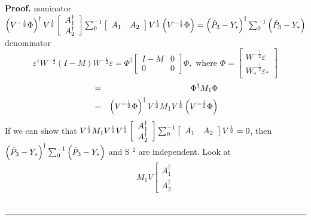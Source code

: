 \documentclass{article}
\newenvironment{proof}[1][Proof]{\noindent\textbf{#1.} }{\ \rule{0.5em}{0.5em}}
\begin{document}
\begin{proof}
nominator $\left( V^{-\frac{1}{2}}\Phi \right) ^{\dagger }V^{\frac{1}{2}}%
\left[ 
\begin{array}{c}
A_{1}^{\dagger } \\ 
A_{2}^{\dagger }%
\end{array}%
\right] \tsum\nolimits_{0}^{-1}\left[ 
\begin{array}{cc}
A_{1} & A_{2}%
\end{array}%
\right] V^{\frac{1}{2}}\left( V^{-\frac{1}{2}}\Phi \right) =\left( \hat{P}%
_{3}-Y_{\ast }\right) ^{\dagger }\tsum\nolimits_{0}^{-1}\left( \hat{P}%
_{3}-Y_{\ast }\right) $\newline
denominator 
\begin{equation*}
\varepsilon ^{\dagger }W^{-\frac{1}{2}}\left( I-M\right) W^{-\frac{1}{2}%
}\varepsilon =\Phi ^{\dagger }\left[ 
\begin{array}{cc}
I-M & 0 \\ 
0 & 0%
\end{array}%
\right] \Phi ,\text{ where }\Phi =\left[ 
\begin{array}{c}
W^{-\frac{1}{2}}\varepsilon \\ 
W_{\ast }^{-\frac{1}{2}}\varepsilon _{\ast }%
\end{array}%
\right]
\end{equation*}%
\begin{eqnarray*}
&=&\Phi ^{\dagger }M_{1}\Phi \\
&=&\left( V^{-\frac{1}{2}}\Phi \right) ^{\dagger }V^{\frac{1}{2}}M_{1}V^{%
\frac{1}{2}}\left( V^{-\frac{1}{2}}\Phi \right)
\end{eqnarray*}%
\newline
If we can show that $V^{\frac{1}{2}}M_{1}V^{\frac{1}{2}}V^{\frac{1}{2}}\left[
\begin{array}{c}
A_{1}^{\dagger } \\ 
A_{2}^{\dagger }%
\end{array}%
\right] \tsum\nolimits_{0}^{-1}\left[ 
\begin{array}{cc}
A_{1} & A_{2}%
\end{array}%
\right] V^{\frac{1}{2}}=0$, then $\left( \hat{P}_{3}-Y_{\ast }\right)
^{\dagger }\mathop{\textstyle \sum }\nolimits_{0}^{-1}\left( \hat{P}_{3}-Y_{\ast }\right) $ and S%
$^{2}$ are independent.\newline
Look at%
\begin{eqnarray*}
M_{1}V\left[ 
\begin{array}{c}
A_{1}^{\dagger } \\ 
A_{2}^{\dagger }%
\end{array}%

\end{eqnarray*}
\end{proof}
\end{document}
